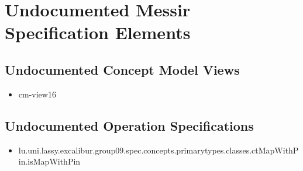 	
\chapter{Undocumented Messir Specification Elements}





















\section[Undocumented Concept Model Views]{Undocumented Concept Model Views}
\begin{itemize}
\item cm-view16 
\end{itemize}


\section[Undocumented Operation Specifications]{Undocumented Operation Specifications}
\begin{itemize}
\item lu.uni.lassy.excalibur.group09.spec.concepts.primarytypes.classes.ctMapWithPin.isMapWithPin 
\end{itemize}









